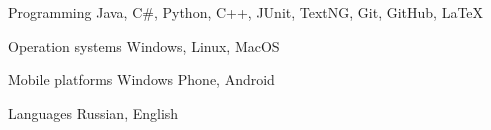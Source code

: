 


\begin{cvskills}


\cvskill
{Programming} %
{Java, C\#, Python, C++, JUnit, TextNG, Git, GitHub, LaTeX} %



\cvskill
{Operation systems} %
{Windows, Linux, MacOS} %

\cvskill
{Mobile platforms} %
{Windows Phone, Android} %


\cvskill
{Languages} %
{Russian, English} %


\end{cvskills}